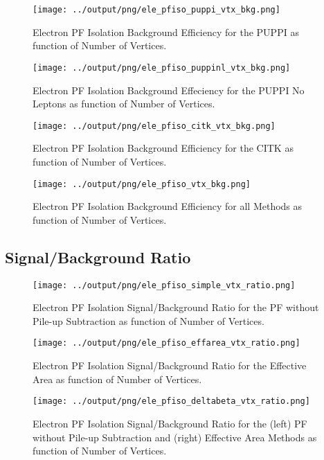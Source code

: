 \documentclass[11pt]{book}
\begin{document}
\begin{figure}[htb]
\centering
\texttt{[image: ../output/png/ele\_pfiso\_puppi\_vtx\_bkg.png]}
\caption{Electron PF Isolation Background Efficiency for the PUPPI as function of Number of Vertices.}
\label{fig:ele_pfiso_vtx_bgk_puppi}
\end{figure}

\begin{figure}[htb]
\centering
\texttt{[image: ../output/png/ele\_pfiso\_puppinl\_vtx\_bkg.png]}
\caption{Electron PF Isolation Background Effeciency for the PUPPI No Leptons as function of Number of Vertices.}
\label{fig:ele_pfiso_vtx_bkg_puppinl}
\end{figure}

\begin{figure}[htb]
\centering
\texttt{[image: ../output/png/ele\_pfiso\_citk\_vtx\_bkg.png]}
\caption{Electron PF Isolation Background Efficiency for the CITK as function of Number of Vertices.}
\label{fig:ele_pfiso_vtx_bkg_citk}
\end{figure}

\begin{figure}[htb]
\centering
\texttt{[image: ../output/png/ele\_pfiso\_vtx\_bkg.png]}
\caption{Electron PF Isolation Background Efficiency for all Methods as function of Number of Vertices.}
\label{fig:ele_pfiso_vtx_bkg}
\end{figure}
\clearpage

\subsection{Signal/Background Ratio}
\begin{figure}[htb]
\centering
\texttt{[image: ../output/png/ele\_pfiso\_simple\_vtx\_ratio.png]}
\caption{Electron PF Isolation Signal/Background Ratio for the PF without Pile-up Subtraction as function of Number of Vertices.}
\label{fig:ele_pfiso_vtx_ratio_simple}
\end{figure}

\begin{figure}[htb]
\centering
\texttt{[image: ../output/png/ele\_pfiso\_effarea\_vtx\_ratio.png]}
\caption{Electron PF Isolation Signal/Background Ratio for the Effective Area as function of Number of Vertices.}
\label{fig:ele_pfiso_vtx_ratio_effarea}
\end{figure}

\begin{figure}[htb]
\centering
\texttt{[image: ../output/png/ele\_pfiso\_deltabeta\_vtx\_ratio.png]}
\caption{Electron PF Isolation Signal/Background Ratio for the (left) PF without Pile-up Subtraction and (right) Effective Area Methods as function of Number of Vertices.}
\label{fig:ele_pfiso_vtx_ratio_deltabeta}
\end{figure}
\end{document}
